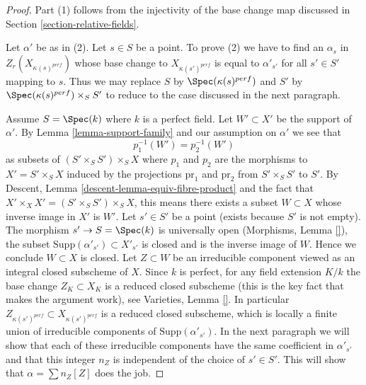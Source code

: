 \begin{proof}
Part (1) follows from the injectivity of the base change map discussed
in Section \ref{section-relative-fields}.

\medskip\noindent
Let $\alpha'$ be as in (2). Let $s \in S$ be a point. To prove (2)
we have to find an $\alpha_s$ in $Z_r(X_{\kappa(s)^{perf}})$
whose base change to $X_{\kappa(s')^{perf}}$ is equal to $\alpha'_{s'}$
for all $s' \in S'$ mapping to $s$. Thus we may replace $S$ by
$\Spec(\kappa(s)^{perf})$ and $S'$ by $\Spec(\kappa(s)^{perf}) \times_S S'$
to reduce to the case discussed in the next paragraph.

\medskip\noindent
Assume $S = \Spec(k)$ where $k$ is a perfect field.
Let $W' \subset X'$ be the support of $\alpha'$.
By Lemma \ref{lemma-support-family}
and our assumption on $\alpha'$ we see that
$$
p_1^{-1}(W') = p_2^{-1}(W')
$$
as subsets of $(S' \times_S S') \times_S X$ where $p_1$ and $p_2$
are the morphisms to $X' = S' \times_S X$ induced by the projections
$\text{pr}_1$ and $\text{pr}_2$ from $S' \times_S S'$ to $S'$.
By Descent, Lemma \ref{descent-lemma-equiv-fibre-product}
and the fact that $X' \times_X X' = (S' \times_S S') \times_S X$,
this means there exists a subset $W \subset X$ whose inverse image in
$X'$ is $W'$. Let $s' \in S'$ be a point (exists because $S'$ is not empty).
The morphism $s' \to S = \Spec(k)$ is universally open
(Morphisms, Lemma \ref{}), the subset
$\text{Supp}(\alpha'_{s'}) \subset X'_{s'}$ is closed and
is the inverse image of $W$. Hence we conclude $W \subset X$ is closed.
Let $Z \subset W$ be an irreducible component viewed as an integral
closed subscheme of $X$. Since $k$ is perfect, for any field extension
$K/k$ the base change $Z_K \subset X_K$ is a reduced closed subscheme
(this is the key fact that makes the argument work), see
Varieties, Lemma \ref{}. In particular
$Z_{\kappa(s')^{perf}} \subset X_{\kappa(s')^{perf}}$
is a reduced closed subscheme, which is locally a finite union of
irreducible components of $\text{Supp}(\alpha'_{s'})$.
In the next paragraph we will show that each of these irreducible
components have the same coefficient in $\alpha'_{s'}$ and that
this integer $n_Z$ is independent of the choice of $s' \in S'$.
This will show that $\alpha = \sum n_Z [Z]$ does the job.


\end{proof}
